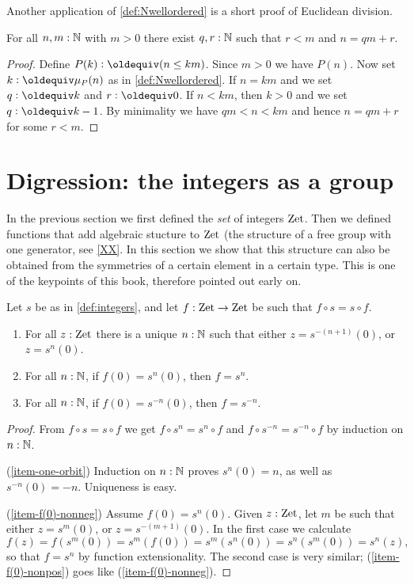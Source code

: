 Another application of \cref{def:Nwellordered} is a
short proof of Euclidean division. 
\begin{lemma}\label{lem:euclid-div}
For all $n,m:\mathbb{N}$ with $m>0$ there exist $q,r:\mathbb{N}$ such that $r<m$ and $n=qm+r$.
\end{lemma}
\begin{proof}
Define $P(k)\defeq (n\leq km)$. Since $m>0$ we have $P(n)$.
Now set $k\defeq\mu_P(n)$ as in \cref{def:Nwellordered}.
If $n=km$ and we set $q\defeq k$ and $r\defeq 0$.
If $n<km$, then $k>0$ and we set $q\defeq k-1$.
By minimality we have $qm<n<km$ and hence $n=qm+r$ for some $r<m$.
\end{proof}

\section{Digression: the integers as a group}
\label{sec:integers-group}

In the previous section we first defined the \emph{set}
of integers $\mathrm{Zet}$. Then we defined functions that add
algebraic stucture to $\mathrm{Zet}$ (the structure of a free group 
with one generator, see \cref{XX}. In this section we
show that this structure can also be obtained from the
symmetries of a certain element in a certain type.
This is one of the keypoints of this book, 
therefore pointed out early on.

\begin{lemma}\label{lem:one-orbit-int}
Let $s$ be as in \cref{def:integers}, and 
let $f:\mathrm{Zet}\to\mathrm{Zet}$ be such that $f\circ s = s\circ f$. 
  \begin{enumerate}
  \item\label{item-one-orbit} For all $z:\mathrm{Zet}$ there is a unique $n:\mathbb{N}$
such that either $z=s^{-(n+1)}(0)$, or $z=s^{n}(0)$.
  \item\label{item-f(0)-nonneg} For all $n:\mathbb{N}$, if $f(0)=s^{n}(0)$, then $f=s^{n}$.
  \item\label{item-f(0)-nonpos} For all $n:\mathbb{N}$, if $f(0)=s^{-n}(0)$, then $f=s^{-n}$.
  \end{enumerate}
\end{lemma}
\begin{proof}
From $f\circ s = s\circ f$ we get $f\circ s^n = s^n\circ f$
and $f\circ s^{-n} = s^{-n}\circ f$ by induction on $n:\mathbb{N}$.

(\ref{item-one-orbit}) Induction on $n:\mathbb{N}$ proves $s^{n}(0)=n$, 
as well as $s^{-n}(0)=-n$. Uniqueness is easy.

(\ref{item-f(0)-nonneg}) Assume $f(0)=s^{n}(0)$.  
Given $z:\mathrm{Zet}$, let $m$ be such that either $z=s^{m}(0)$, 
or $z=s^{-(m+1)}(0)$. In the first case we calculate
\[
f(z)=f(s^{m}(0))=s^{m}(f(0))=s^{m}(s^{n}(0))=s^{n}(s^{m}(0))= s^{n}(z),
\]
so that $f=s^{n}$ by function extensionality. 
The second case is very similar;
(\ref{item-f(0)-nonpos}) goes like (\ref{item-f(0)-nonneg}).
\end{proof}

